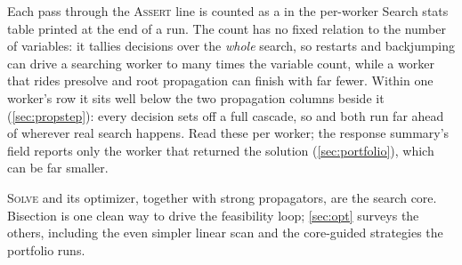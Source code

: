 \begin{platypuslog}[htb]
Each pass through the \textsc{Assert} line is counted as a  in the
per-worker \textsf{Search stats} table printed at the end of a run. The count has
no fixed relation to the number of variables: it tallies decisions over the
\emph{whole} search, so restarts and backjumping can drive a searching worker to
many times the variable count, while a worker that rides presolve and root
propagation can finish with far fewer. Within one worker's row it sits well below
the two propagation columns beside it (\cref{sec:propstep}): every decision sets
off a full cascade, so  and  both run far
ahead of  wherever real search happens. Read these per worker; the
response summary's  field reports only the worker that returned
the solution (\cref{sec:portfolio}), which can be far smaller.
\end{platypuslog}

\textsc{Solve} and its optimizer, together with strong propagators, are the search
core. Bisection is one clean way to drive the feasibility loop;
\cref{sec:opt} surveys the others, including the even simpler linear scan and
the core-guided strategies the portfolio runs.

